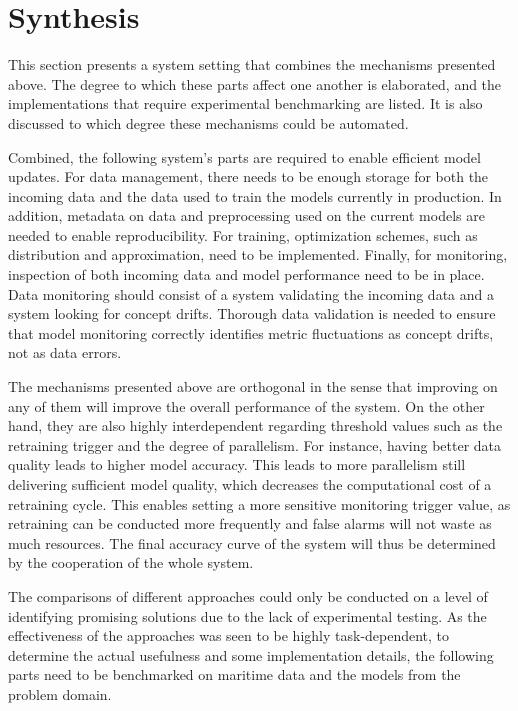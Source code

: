 \section{Synthesis}

This section presents a system setting that combines the mechanisms presented above. The degree to which these parts affect one another is elaborated, and the implementations that require experimental benchmarking are listed. It is also discussed to which degree these mechanisms could be automated.


\enlargethispage{14mm}
Combined, the following system's parts are required to enable efficient model updates. For data management, there needs to be enough storage for both the incoming data and the data used to train the models currently in production. In addition, metadata on data and preprocessing used on the current models are needed to enable reproducibility. For training, optimization schemes, such as distribution and approximation, need to be implemented. Finally, for monitoring, inspection of both incoming data and model performance need to be in place. Data monitoring should consist of a system validating the incoming data and a system looking for concept drifts. Thorough data validation is needed to ensure that model monitoring correctly identifies metric fluctuations as concept drifts, not as data errors.

The mechanisms presented above are orthogonal in the sense that improving on any of them will improve the overall performance of the system. On the other hand, they are also highly interdependent regarding threshold values such as the retraining trigger and the degree of parallelism. For instance, having better data quality leads to higher model accuracy. This leads to more parallelism still delivering sufficient model quality, which decreases the computational cost of a retraining cycle. This enables setting a more sensitive monitoring trigger value, as retraining can be conducted more frequently and false alarms will not waste as much resources. The final accuracy curve of the system will thus be determined by the cooperation of the whole system.

The comparisons of different approaches could only be conducted on a level of identifying promising solutions due to the lack of experimental testing. As the effectiveness of the approaches was seen to be highly task-dependent, to determine the actual usefulness and some implementation details, the following parts need to be benchmarked on maritime data and the models from the problem domain.

